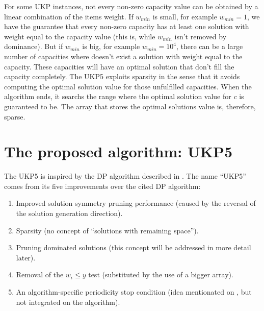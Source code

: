 \documentclass[runningheads,a4paper]{llncs}
\begin{document}
For some UKP instances, not every non-zero capacity value can be obtained by a linear combination of the items weight. If \(w_{min}\) is small, for example \(w_{min} = 1\), we have the guarantee that every non-zero capacity has at least one solution with weight equal to the capacity value (this is, while \(w_{min}\) isn't removed by dominance). But if \(w_{min}\) is big, for example \(w_{min} = 10^4\), there can be a large number of capacities where doesn't exist a solution with weight equal to the capacity. These capacities will have an optimal solution that don't fill the capacity completely. The UKP5 exploits sparsity in the sense that it avoids computing the optimal solution value for those unfulfilled capacities. When the algorithm ends, it searchs the range where the optimal solution value for \(c\) is guaranteed to be. The array that stores the optimal solutions value is, therefore, sparse.

\section{The proposed algorithm: UKP5}

The UKP5 is inspired by the DP algorithm described in \cite[p. 221]{gar72}. The name ``UKP5'' comes from its five improvements over the cited DP algorithm:

\begin{enumerate}
  \item Improved solution symmetry pruning performance (caused by the reversal of the solution generation direction).
  \item Sparsity (no concept of ``solutions with remaining space'').
  \item Pruning dominated solutions (this concept will be addressed in more detail later).
  \item Removal of the \(w_i \leq y\) test (substituted by the use of a bigger array).
  \item An algorithm-specific periodicity stop condition (idea mentionated on \cite{gar72}, but not integrated on the algorithm).
\end{enumerate}
\end{document}
